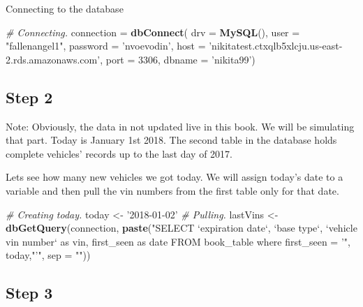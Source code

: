 \documentclass[]{book}
\newenvironment{Shaded}{\begin{snugshade}}{\end{snugshade}}
\newcommand{\CommentTok}[1]{\textcolor[rgb]{0.56,0.35,0.01}{\textit{#1}}}
\newcommand{\DataTypeTok}[1]{\textcolor[rgb]{0.13,0.29,0.53}{#1}}
\newcommand{\DecValTok}[1]{\textcolor[rgb]{0.00,0.00,0.81}{#1}}
\newcommand{\KeywordTok}[1]{\textcolor[rgb]{0.13,0.29,0.53}{\textbf{#1}}}
\newcommand{\NormalTok}[1]{#1}
\newcommand{\StringTok}[1]{\textcolor[rgb]{0.31,0.60,0.02}{#1}}
\begin{document}
Connecting to the database

\begin{Shaded}
\begin{Highlighting}[]
\CommentTok{# Connecting.}
\NormalTok{connection =}\StringTok{ }
\StringTok{  }\KeywordTok{dbConnect}\NormalTok{(}
    \DataTypeTok{drv =} \KeywordTok{MySQL}\NormalTok{(), }
    \DataTypeTok{user =} \StringTok{"fallenangel1"}\NormalTok{, }
    \DataTypeTok{password =} \StringTok{'nvoevodin'}\NormalTok{, }
    \DataTypeTok{host =} \StringTok{'nikitatest.ctxqlb5xlcju.us-east-2.rds.amazonaws.com'}\NormalTok{, }
    \DataTypeTok{port =} \DecValTok{3306}\NormalTok{, }
    \DataTypeTok{dbname =} \StringTok{'nikita99'}\NormalTok{)}
\end{Highlighting}
\end{Shaded}

\hypertarget{step-2}{%
\subsection{Step 2}\label{step-2}}

Note: Obviously, the data in not updated live in this book. We will be simulating that part. Today is January 1st 2018. The second table in the database holds complete vehicles' records up to the last day of 2017.

Lets see how many new vehicles we got today. We will assign today's date to a variable and then pull the vin numbers from the first table only for that date.

\begin{Shaded}
\begin{Highlighting}[]
\CommentTok{# Creating today.}
\NormalTok{today <-}\StringTok{ '2018-01-02'}
\CommentTok{# Pulling.}
\NormalTok{lastVins <-}\StringTok{ }\KeywordTok{dbGetQuery}\NormalTok{(connection, }\KeywordTok{paste}\NormalTok{(}\StringTok{"SELECT}
\StringTok{`expiration date`, }
\StringTok{`base type`,}
\StringTok{`vehicle vin number` as vin, }
\StringTok{first_seen as date }
\StringTok{FROM book_table }
\StringTok{where first_seen = '"}\NormalTok{, today,}\StringTok{"'"}\NormalTok{,}
\DataTypeTok{sep =} \StringTok{""}\NormalTok{))}
\end{Highlighting}
\end{Shaded}

\hypertarget{step-3}{%
\subsection{Step 3}\label{step-3}}
\end{document}
